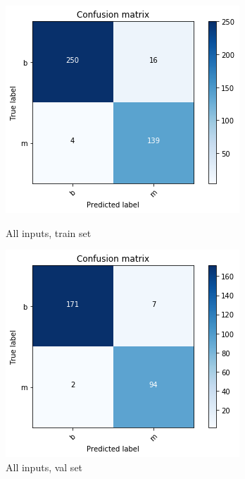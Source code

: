 \documentclass[11pt,a4paper]{article}
\begin{document}
\begin{enumerate}
\begin{enumerate}
		\begin{figure}[H]\centering
			\begin{minipage}{0.49\linewidth}
				\includegraphics[width=\linewidth]{figures/conf_train_all.png}
				\caption{All inputs, train set}\label{fig:conf_train_all.png}
			\end{minipage}
			\begin{minipage}{0.49\linewidth}
				\includegraphics[width=\linewidth]{figures/conf_val_all.png}
				\caption{All inputs, val set}\label{fig:conf_val_all.png}
			\end{minipage}
		\end{figure}	
		
	\end{enumerate}
	
	\end{enumerate}
\end{document}
